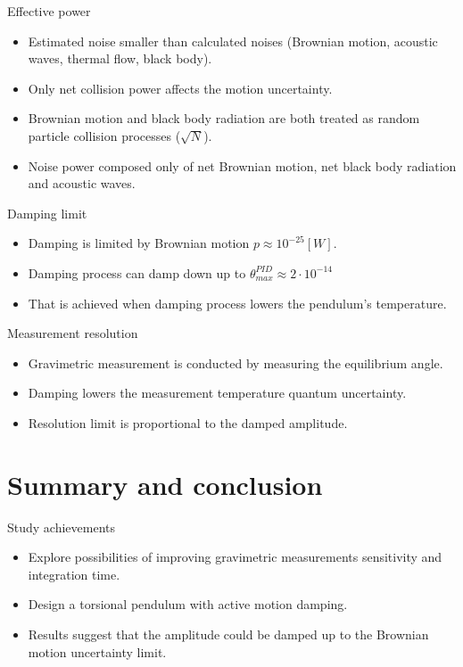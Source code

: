 \documentclass{beamer}
\begin{document}
\begin{frame}{Effective power}
	
	\begin{itemize}	
		\item Estimated noise smaller than calculated noises (Brownian motion, acoustic waves, thermal flow, black body).
		\item Only net collision power affects the motion uncertainty.
		\item Brownian motion and black body radiation are both treated as random particle collision processes ($\sqrt{N}$).
		\item Noise power composed only of net Brownian motion, net black body radiation and acoustic waves.  	 
					
	\end{itemize}
\end{frame}
\begin{frame}{Damping limit}
	
	\begin{itemize}	 
		\item Damping is limited by Brownian motion $p\approx 10^{-25}  [W]$.
		\item Damping process can damp down up to $\theta_{max}^{PID}\approx 2\cdot 10^{-14}$
		\item That is achieved when damping process lowers the pendulum's temperature.  				
	\end{itemize}
\end{frame}
\begin{frame}{Measurement resolution}
	
	\begin{itemize}	 
		\item Gravimetric measurement is conducted by measuring the equilibrium angle.
		\item Damping lowers the measurement temperature quantum uncertainty.
		\item Resolution limit is proportional to the damped amplitude. 				
	\end{itemize}
\end{frame}

\section{Summary and conclusion}
\begin{frame}{Study achievements}
	\begin{itemize}
		
		
		\item Explore possibilities of improving gravimetric measurements sensitivity and integration time. 
		\item Design a torsional pendulum with active motion damping. 
		\pause
		\item Results suggest that the amplitude could be damped up to the Brownian motion uncertainty limit. 
		
		
	\end{itemize}
\end{frame}
\end{document}
